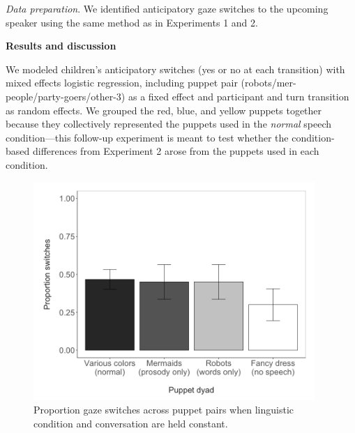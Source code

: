 \documentclass[authoryear, 12pt]{elsarticle}
\begin{document}
\medskip
\noindent \textit{Data preparation}. We identified anticipatory gaze switches to the upcoming speaker using the same method as in Experiments 1 and 2.

\bigskip
\noindent \textbf{Results and discussion}
\medskip

\noindent We modeled children's anticipatory switches (yes or no at each transition) with mixed effects logistic regression, including puppet pair (robots/mer- people/party-goers/other-3) as a fixed effect and participant and turn transition as random effects. We grouped the red, blue, and yellow puppets together because they collectively represented the puppets used in the \textit{normal} speech condition---this follow-up experiment is meant to test whether the condition-based differences from Experiment 2 arose from the puppets used in each condition.

\begin{figure}[!htb]
\begin{center}
\includegraphics[width=0.95\textwidth]{figures/all-puppetdyads-bars.png}
\end{center}
\caption{Proportion gaze switches across puppet pairs when linguistic condition and conversation are held constant.}
\label{fig:pairconfound}
\end{figure}

\clearpage
\end{document}
